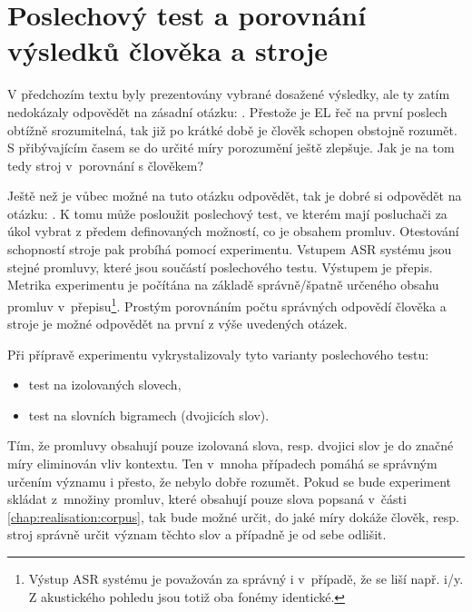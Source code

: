 \section{Poslechový test a porovnání výsledků člověka a stroje}
\label{chap:realisation:listening}

V předchozím textu byly prezentovány vybrané dosažené výsledky, ale ty zatím nedokázaly odpovědět na zásadní otázku: .
Přestože je EL řeč na první poslech obtížně srozumitelná, tak již po krátké době je člověk schopen obstojně rozumět.
S přibývajícím časem se do určité míry porozumění ještě zlepšuje.
Jak je na tom tedy stroj v~porovnání s člověkem?

Ještě než je vůbec možné na tuto otázku odpovědět, tak je dobré si odpovědět na otázku: .
K tomu může posloužit poslechový test, ve kterém mají posluchači za úkol vybrat z předem definovaných možností, co je obsahem promluv.
Otestování schopností stroje pak probíhá pomocí experimentu.
Vstupem ASR systému jsou stejné promluvy, které jsou součástí poslechového testu.
Výstupem je přepis.
Metrika experimentu je počítána na základě správně/špatně určeného obsahu promluv v~přepisu\footnote{Výstup ASR systému je považován za správný i v~případě, že se liší např. i/y. Z akustického pohledu jsou totiž oba fonémy identické.}.
Prostým porovnáním počtu správných odpovědí člověka a stroje je možné odpovědět na první z výše uvedených otázek.

Při přípravě experimentu vykrystalizovaly tyto varianty poslechového testu:

\begin{itemize}
  \item test na izolovaných slovech,
  \item test na slovních bigramech (dvojicích slov).
\end{itemize}

\noindent Tím, že promluvy obsahují pouze izolovaná slova, resp. dvojici slov je do značné míry eliminován vliv kontextu.
Ten v~mnoha případech pomáhá se správným určením významu i přesto, že nebylo dobře rozumět.
Pokud se bude experiment skládat z~množiny promluv, které obsahují pouze slova popsaná v~části \ref{chap:realisation:corpus}, tak bude možné určit, do jaké míry dokáže člověk, resp. stroj správně určit význam těchto slov a případně je od sebe odlišit.

